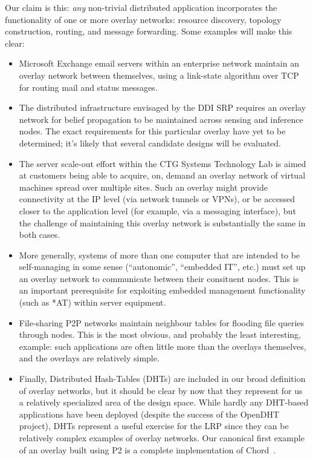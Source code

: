 \documentclass[twocolumn,10pt]{article}
\def\Sys{P2\xspace}
\begin{document}
Our claim is this: \emph{any} non-trivial distributed application 
incorporates the functionality of one or more overlay networks:
resource discovery, topology construction, routing, and message
forwarding.  Some examples will make this clear:
\begin{itemize}

\item Microsoft Exchange email servers within an enterprise network
  maintain an overlay network between themselves, using a link-state
  algorithm over TCP for routing mail and status messages. 

\item The distributed infrastructure envisaged by the DDI
  SRP requires an overlay network for belief
  propagation to be maintained across sensing and inference nodes.
  The exact requirements for this particular overlay have yet to be
  determined; it's likely that several candidate designs will be evaluated.

\item The server scale-out effort within the CTG Systems Technology
  Lab is aimed at 
  customers being able to acquire, on, demand an overlay network of
  virtual machines spread over multiple sites.  Such an overlay might
  provide connectivity at the IP level (via network tunnels or VPNs),
  or be accessed closer to the application level (for example, via a
  messaging interface), but the challenge of maintaining this overlay
  network is substantially the same in both cases. 

\item More generally, systems of more than one computer that are
  intended to be self-managing in some sense (``autonomic'',
  ``embedded IT'', etc.) must set up an overlay network to communicate
  between their consituent nodes.  This is an important prerequisite
  for exploiting embedded management functionality (such as *AT)
  within server equipment. 

\item File-sharing P2P networks maintain neighbour tables for flooding
  file queries through nodes.  This is the most obvious, and probably
  the least interesting, example: such applications are often little
  more than the overlays themselves, and the overlays are relatively
  simple. 

\item Finally, Distributed Hash-Tables (DHTs) are included in our
  broad definition of overlay networks, but it should be clear by now
  that they represent for us a relatively specialized area of the
  design space.  While hardly any DHT-based applications have been
  deployed (despite the success of the OpenDHT project), DHTs
  represent a useful exercise for the LRP since they can be relatively
  complex examples of overlay networks.  Our canonical first example
  of an overlay built using \Sys is a complete implementation of
  Chord~\cite{chord}. 

\end{itemize}
\end{document}
